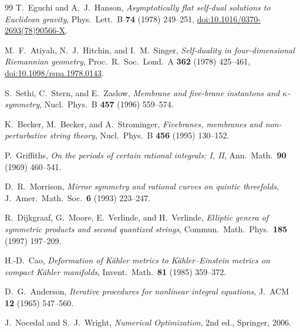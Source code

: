 \documentclass[11pt,a4paper]{article}
\begin{document}
\begin{thebibliography}{99}
T.~Eguchi and A.~J.~Hanson,
\emph{Asymptotically flat self-dual solutions to Euclidean gravity},
Phys.\ Lett.\ B \textbf{74} (1978) 249--251,
\href{https://doi.org/10.1016/0370-2693(78)90566-X}{doi:10.1016/0370-2693(78)90566-X}.

M.~F.~Atiyah, N.~J.~Hitchin, and I.~M.~Singer,
\emph{Self-duality in four-dimensional Riemannian geometry},
Proc.\ R.\ Soc.\ Lond.\ A \textbf{362} (1978) 425--461,
\href{https://doi.org/10.1098/rspa.1978.0143}{doi:10.1098/rspa.1978.0143}.

S.~Sethi, C.~Stern, and E.~Zaslow,
\emph{Membrane and five-brane instantons and $\kappa$-symmetry},
Nucl.\ Phys.\ B \textbf{457} (1996) 559--574.

K.~Becker, M.~Becker, and A.~Strominger,
\emph{Fivebranes, membranes and non-perturbative string theory},
Nucl.\ Phys.\ B \textbf{456} (1995) 130--152.

P.~Griffiths,
\emph{On the periods of certain rational integrals: I, II},
Ann.\ Math.\ \textbf{90} (1969) 460--541.

D.~R.~Morrison,
\emph{Mirror symmetry and rational curves on quintic threefolds},
J.\ Amer.\ Math.\ Soc.\ \textbf{6} (1993) 223--247.

R.~Dijkgraaf, G.~Moore, E.~Verlinde, and H.~Verlinde,
\emph{Elliptic genera of symmetric products and second quantized strings},
Commun.\ Math.\ Phys.\ \textbf{185} (1997) 197--209.

H.-D.~Cao,
\emph{Deformation of K\"{a}hler metrics to K\"{a}hler--Einstein metrics on compact K\"{a}hler manifolds},
Invent.\ Math.\ \textbf{81} (1985) 359--372.

D.~G.~Anderson,
\emph{Iterative procedures for nonlinear integral equations},
J.\ ACM \textbf{12} (1965) 547--560.

J.~Nocedal and S.~J.~Wright,
\emph{Numerical Optimization}, 2nd ed., Springer, 2006.

\end{thebibliography}
\end{document}
